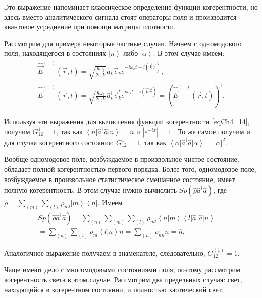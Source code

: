 Это выражение напоминает классическое определение функции
когерентности, но здесь вместо аналитического сигнала стоят операторы
поля и производится квантовое усреднение при помощи матрицы
плотности. 

Рассмотрим для примера некоторые частные случаи. Начнем с одномодового
поля, находящегося в состояниях  $\left|n\right>$  либо  $\left|\alpha\right>$.  В этом случае имеем: 
\begin{eqnarray}
\hat{\vec{E}}^{(+)}\left(\vec{r}, t\right) = \sqrt{\frac{\hbar \omega_k}{2 \varepsilon_0
    V}} \hat{a}_k \vec{e}_k e^{-i \omega_k t + i \left(\vec{k}\vec{r}
  \right)},
\nonumber \\
\hat{\vec{E}}^{(-)}\left(\vec{r}, t\right) = \sqrt{\frac{\hbar \omega_k}{2 \varepsilon_0
V}} \hat{a}_k^{\dag} \vec{e}_k^{*} e^{i \omega_k t - i \left(\vec{k}\vec{r}
  \right)} = \left(\hat{\vec{E}}^{(+)}\left(\vec{r}, t\right)\right)^{\dag}.
\label{eqCh4_15}
\end{eqnarray}

Используя эти выражения для вычисления функции когерентности
\eqref{eqCh4_14}, получим $G_{12}^{1} = 1$,  так как
$\left<n\right|\hat{a}^{\dag}\hat{a}\left|n\right> = n$   и
$\left|e^{-i x}\right| = 1$ . То же самое получим и для случая
когерентного состояния:  $G_{12}^{1} = 1$,  так как
$\left<\alpha\right|\hat{a}^{\dag}\hat{a}\left|\alpha\right> =
\left|\alpha\right|^2$. 

Вообще одномодовое поле, возбуждаемое в произвольное чистое состояние,
обладает полной когерентностью первого порядка. Более того,
одномодовое поле, возбуждаемое в произвольное статистическое смешанное
состояние, имеет полную когерентность. В этом случае нужно вычислить
$Sp \left(\hat{\rho} \hat{a}^{\dag}\hat{a}\right)$,  где  $\hat{\rho} =
\sum_{(m)}\sum_{(l)}\rho_{ml}\left|m\right>\left<n\right|$.  Имеем  
\begin{eqnarray}
Sp \left(\hat{\rho} \hat{a}^{\dag}\hat{a}\right) = 
\sum_{(n)}\sum_{(m)}\sum_{(l)}\rho_{ml}\left<n\right.\left|m\right>\left<l\right|
\hat{a}^{\dag}\hat{a}\left|n\right> = 
\nonumber \\
= \sum_{(n)}\sum_{(l)}\rho_{nl}\left<l\right.\left|n\right>n = 
\sum_{(n)}\rho_{nn}n = \bar{n}.
\label{eqCh4_16}
\end{eqnarray}

Аналогичное выражение получаем в знаменателе, следовательно,
$G_{12}^{(1)} = 1$.

Чаще имеют дело с многомодовыми состояниями поля, поэтому рассмотрим
когерентность света в этом случае. Рассмотрим два предельных случая:
свет, находящийся в когерентном состоянии, и полностью хаотический
свет. 

